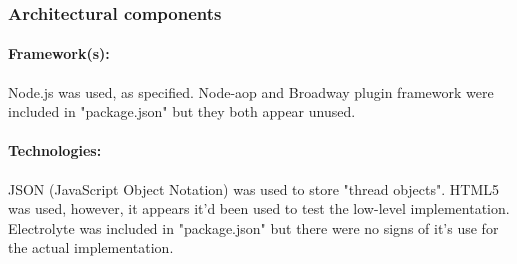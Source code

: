 \subsubsection{Architectural components}
\paragraph {Framework(s):}
Node.js was used, as specified. Node-aop and Broadway plugin framework were included in "package.json"  but they both appear unused.
\par
\paragraph{Technologies:}
 JSON (JavaScript Object Notation) was used to store "thread objects". HTML5 was used, however, it appears it'd been used to test the low-level implementation. Electrolyte was included in "package.json" but there were no signs of it's use for the actual implementation.
\par
